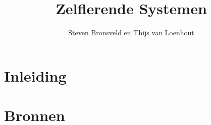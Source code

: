 \documentclass[a4paper,titlepage]{article}
\title{Zelflerende Systemen}
\author{Steven Bronsveld en Thijs van Loenhout}
\begin{document}
\begin{titlepage}
\maketitle
\end{titlepage}

\renewcommand{\contentsname}{Inhoud}

\newpage
\tableofcontents
\newpage

\section{Inleiding}

\newpage


\newpage


\newpage
\section{Bronnen}


\end{document}
